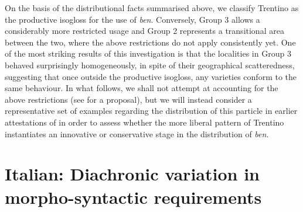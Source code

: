 \documentclass[output=paper]{langsci/langscibook}
\begin{document}
On the basis of the distributional facts summarised above, we classify Trentino
as the productive isogloss for the use of \emph{ben}. Conversely, Group 3
allows a considerably more restricted usage and Group 2 represents a
transitional area between the two, where the above restrictions do not apply
consistently yet. One of the most striking results of this investigation is
that the localities in Group 3 behaved surprisingly homogeneously, in spite of
their geographical scatteredness, suggesting that once outside the productive
isogloss, any varieties conform to the same behaviour. In what follows, we
shall not attempt at accounting for the above restrictions (see
\citealt{CognSchi2018b,CognSchi2018} for a proposal), but we will instead
consider a representative set of examples regarding the distribution of this
particle in earlier attestations of  in order to assess whether
the more liberal pattern of Trentino instantiates an innovative or conservative
stage in the distribution of \emph{ben}.

\section{Italian: Diachronic variation in morpho-syntactic
requirements}\label{sec:23-diachronic}
\end{document}
